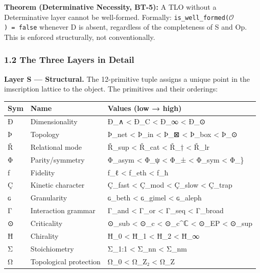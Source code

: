 \textbf{Theorem (Determinative Necessity, BT-5):} A TLO without a
Determinative layer cannot be well-formed. Formally:
\texttt{is\_well\_formed(\(\mathcal{O}\))\ =\ false} whenever D is absent, regardless
of the completeness of S and Op. This is enforced structurally, not
conventionally.

\subsubsection{1.2 The Three Layers in
Detail}\label{the-three-layers-in-detail}

\textbf{Layer S --- Structural.} The 12-primitive tuple assigns a unique
point in the imscription lattice to the object. The primitives and their
orderings:

{\def\LTcaptype{none} %
\begin{longtable}[]{@{}lll@{}}
\toprule\noalign{}
Sym & Name & Values (low → high) \\
\midrule\noalign{}
\endhead
\bottomrule\noalign{}
\endlastfoot
Ð & Dimensionality & Ð\_∧ \textless{} Ð\_C \textless{} Ð\_∞ \textless{}
Ð\_⊙ \\
Þ & Topology & Þ\_net \textless{} Þ\_in \textless{} Þ\_⊠ \textless{}
Þ\_box \textless{} Þ\_⊙ \\
Ř & Relational mode & Ř\_sup \textless{} Ř\_cat \textless{} Ř\_†
\textless{} Ř\_lr \\
Φ & Parity/symmetry & Φ\_asym \textless{} Φ\_ψ \textless{} Φ\_±
\textless{} Φ\_sym \textless{} Φ\_\} \\
ƒ & Fidelity & ƒ\_ℓ \textless{} ƒ\_eth \textless{} ƒ\_ħ \\
Ç & Kinetic character & Ç\_fast \textless{} Ç\_mod \textless{} Ç\_slow
\textless{} Ç\_trap \\
ɢ & Granularity & ɢ\_beth \textless{} ɢ\_gimel \textless{} ɢ\_aleph \\
Γ & Interaction grammar & Γ\_and \textless{} Γ\_or \textless{} Γ\_seq
\textless{} Γ\_broad \\
⊙ & Criticality & ⊙\_sub \textless{} ⊙\_c \textless{} ⊙\_c\^{}ℂ
\textless{} ⊙\_EP \textless{} ⊙\_sup \\
Ħ & Chirality & Ħ\_0 \textless{} Ħ\_1 \textless{} Ħ\_2 \textless{}
Ħ\_∞ \\
Σ & Stoichiometry & Σ\_1:1 \textless{} Σ\_nn \textless{} Σ\_nm \\
Ω & Topological protection & Ω\_0 \textless{} Ω\_Z₂ \textless{} Ω\_Z \\
\end{longtable}
}

